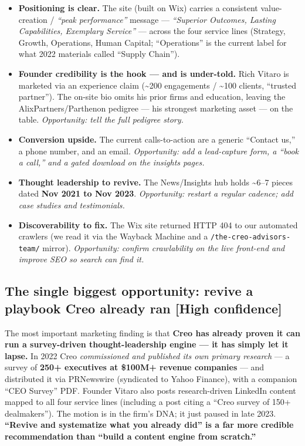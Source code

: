 \documentclass[11pt]{article}
\newcommand{\high}{\textcolor{green!45!black}{\textbf{[High confidence]}}}
\begin{document}
\begin{itemize}
  \item \textbf{Positioning is clear.} The site (built on Wix) carries a consistent
  value-creation / \emph{``peak performance''} message --- \emph{``Superior Outcomes,
  Lasting Capabilities, Exemplary Service''} --- across the four service lines (Strategy,
  Growth, Operations, Human Capital; ``Operations'' is the current label for what 2022
  materials called ``Supply Chain'').
  \item \textbf{Founder credibility is the hook --- and is under-told.} Rich Vitaro is
  marketed via an experience claim (\textasciitilde{}200 engagements / \textasciitilde{}100
  clients, ``trusted partner''). The on-site bio omits his prior firms and education,
  leaving the AlixPartners/Parthenon pedigree --- his strongest marketing asset --- on the
  table. \emph{Opportunity: tell the full pedigree story.}
  \item \textbf{Conversion upside.} The current calls-to-action are a generic ``Contact
  us,'' a phone number, and an email. \emph{Opportunity: add a lead-capture form, a
  ``book a call,'' and a gated download on the insights pages.}
  \item \textbf{Thought leadership to revive.} The News/Insights hub holds
  \textasciitilde{}6--7 pieces dated \textbf{Nov 2021 to Nov 2023}. \emph{Opportunity:
  restart a regular cadence; add case studies and testimonials.}
  \item \textbf{Discoverability to fix.} The Wix site returned HTTP 404 to our automated
  crawlers (we read it via the Wayback Machine and a \texttt{/the-creo-advisors-team/}
  mirror). \emph{Opportunity: confirm crawlability on the live front-end and improve SEO so
  search can find it.}
\end{itemize}

\subsection{The single biggest opportunity: revive a playbook Creo already ran \high}
The most important marketing finding is that \textbf{Creo has already proven it can run a
survey-driven thought-leadership engine --- it has simply let it lapse.} In 2022 Creo
\emph{commissioned and published its own primary research} --- a survey of
\textbf{250+ executives at \$100M+ revenue companies} --- and distributed it via PRNewswire
(syndicated to Yahoo Finance), with a companion ``CEO Survey'' PDF. Founder Vitaro also
posts research-driven LinkedIn content mapped to all four service lines (including a post
citing a ``Creo survey of 150+ dealmakers''). The motion is in the firm's DNA; it just
paused in late 2023. \textbf{``Revive and systematize what you already did'' is a far more
credible recommendation than ``build a content engine from scratch.''}
\end{document}

